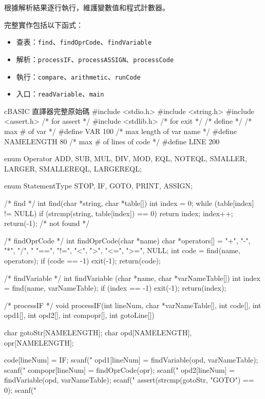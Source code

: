 根據解析結果逐行執行，維護變數值和程式計數器。

完整實作包括以下函式：
\begin{itemize}
\item 查表：\texttt{find}、\texttt{findOprCode}、\texttt{findVariable}
\item 解析：\texttt{processIF}、\texttt{processASSIGN}、\texttt{processCode}
\item 執行：\texttt{compare}、\texttt{arithmetic}、\texttt{runCode}
\item 入口：\texttt{readVariable}、\texttt{main}
\end{itemize}

\begin{code}{c}{BASIC 直譯器完整原始碼}
#include <stdio.h>
#include <string.h>
#include <assert.h> /* for assert */
#include <stdlib.h> /* for exit */
/* define */
/* max # of var */
#define VAR 100
/* max length of var name */
#define NAMELENGTH 80
/* max # of lines of code */
#define LINE 200

enum Operator
  {ADD, SUB, MUL, DIV, MOD, EQL, NOTEQL,
   SMALLER, LARGER, SMALLEREQL, LARGEREQL};

enum StatementType
  {STOP, IF, GOTO, PRINT, ASSIGN};

/* find */
int find(char *string, char *table[])
{
  int index = 0;
  while (table[index] != NULL) {
    if (strcmp(string, table[index]) == 0)
      return index;
    index++;
  }
  return(-1); /* not found */
}

/* findOprCode */
int findOprCode(char *name)
{
  char *operators[] = {"+", "-", "*", "/", "%
                       "==", "!=", "<", ">",
                       "<=", ">=", NULL};
  int code = find(name, operators);
  if (code == -1)
    exit(-1);
  return(code);
}

/* findVariable */
int findVariable (char *name,
                  char *varNameTable[])
{
  int index = find(name, varNameTable);
  if (index == -1)
    exit(-1);
  return(index);
}

/* processIF */
void processIF(int lineNum, char *varNameTable[],
               int code[], int opd1[],
               int opd2[], int compopr[],
               int gotoLine[])
{
  char gotoStr[NAMELENGTH];
  char opd[NAMELENGTH], opr[NAMELENGTH];

  code[lineNum] = IF;
  scanf("%
  opd1[lineNum] = 
    findVariable(opd, varNameTable);
  scanf("%
  compopr[lineNum] = findOprCode(opr);
  scanf("%
  opd2[lineNum] = 
    findVariable(opd, varNameTable);
  scanf("%
  assert(strcmp(gotoStr, "GOTO") == 0);
  scanf("%
}


\end{code}
